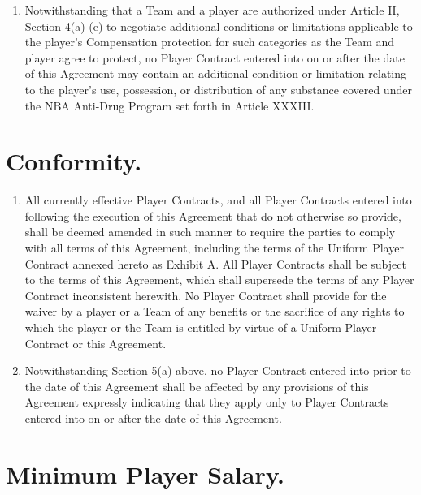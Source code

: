 \documentclass[
]{book}
\providecommand{\tightlist}{%
  \setlength{\itemsep}{0pt}\setlength{\parskip}{0pt}}
\begin{document}
\begin{enumerate}
\item
  Notwithstanding that a Team and a player are authorized under Article II, Section 4(a)-(e) to negotiate additional conditions or limitations applicable to the player's Compensation protection for such categories as the Team and player agree to protect, no Player Contract entered into on or after the date of this Agreement may contain an additional condition or limitation relating to the player's use, possession, or distribution of any substance covered under the NBA Anti-Drug Program set forth in Article XXXIII.
\end{enumerate}

\hypertarget{conformity.}{%
\section{Conformity.}\label{conformity.}}

\begin{enumerate}
\def\labelenumi{(\alph{enumi})}
\tightlist
\item
  All currently effective Player Contracts, and all Player Contracts entered into following the execution of this Agreement that do not otherwise so provide, shall be deemed amended in such manner to require the parties to comply with all terms of this Agreement, including the terms of the Uniform Player Contract annexed hereto as Exhibit A. All Player Contracts shall be subject to the terms of this Agreement, which shall supersede the terms of any Player Contract inconsistent herewith. No Player Contract shall provide for the waiver by a player or a Team of any benefits or the sacrifice of any rights to which the player or the Team is entitled by virtue of a Uniform Player Contract or this Agreement.
\item
  Notwithstanding Section 5(a) above, no Player Contract entered into prior to the date of this Agreement shall be affected by any provisions of this Agreement expressly indicating that they apply only to Player Contracts entered into on or after the date of this Agreement.
\end{enumerate}

\hypertarget{minimum-player-salary.}{%
\section{Minimum Player Salary.}\label{minimum-player-salary.}}
\end{document}
